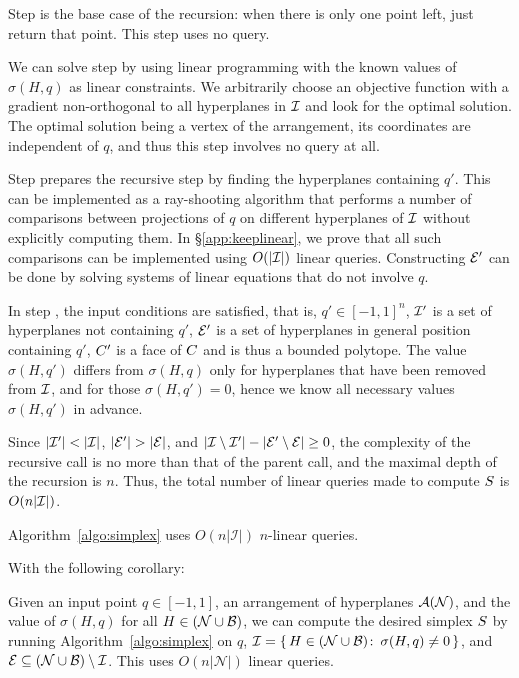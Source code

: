 Step  is the base case of the recursion: when there is only one point left,
just return that point. This step uses no query.

We can solve step  by using linear programming with the known values
of \(\sigma(H,q)\) as linear constraints. We arbitrarily choose an
objective function with a gradient non-orthogonal to all hyperplanes in
\(\mathcal{I}\) and look for the optimal solution. The optimal solution being a vertex of the arrangement,
its coordinates are independent of \(q\), and thus this step involves no query at all.

Step  prepares the recursive step by finding the hyperplanes containing
\(q'\). This can be implemented as a ray-shooting algorithm that performs
a number of comparisons between projections of $q$ on different hyperplanes of $\mathcal{I}$ without
explicitly computing them. In \S\ref{app:keeplinear}, we prove that all such comparisons
can be implemented using \(O(|{\mathcal{I}}|)\) linear queries.
Constructing \(\mathcal{E}'\) can be done by solving systems of linear
equations that do not involve \(q\).

In step , the input conditions are satisfied, that is, $q' \in
{[-1,1]}^n$, \(\mathcal{I}'\) is a set of hyperplanes not containing \(q'\), \(\mathcal{E}'\) is
a set of hyperplanes in general position containing \(q'\), \(C'\) is a
face of \(C\) and is thus a bounded polytope. The value \(\sigma(H,q')\)
differs from \(\sigma(H,q)\) only for hyperplanes that have been removed from
\(\mathcal{I}\), and for those \(\sigma(H,q') = 0\), hence we know all necessary values
\(\sigma(H,q')\) in advance.

Since \(|{\mathcal{I}'}| < |{\mathcal{I}}|\), \(|{\mathcal{E}'}| > |{\mathcal{E}}|\), and
\(|{\mathcal{I}\setminus\mathcal{I}'}| - |{\mathcal{E}'\setminus\mathcal{E}}| \ge 0\), the complexity of the
recursive call is no more than that of the parent call, and the maximal depth
of the recursion is \(n\). Thus, the total number of
linear queries made to compute \(S\) is \(O(n|{\mathcal{I}}|)\).
%
\begin{lemma}[%
	label={lem:simplex}%
]
	Algorithm~\ref{algo:simplex} uses \(O(n | \mathcal{I} |)\) \(n\)-linear
	queries.
\end{lemma}

With the following corollary:
%
\begin{corollary}[%
	label={cor:simplex}%
]
Given an input point \(q \in [-1,1]\), an arrangement of hyperplanes
\(\mathcal{A}(\mathcal{N})\), and the value of \(\sigma(H,q)\) for all
\(H \in (\mathcal{N}\cup\mathcal{B})\), we can compute the desired simplex \(S\)
by running Algorithm~\ref{algo:simplex} on \(q\),
\(\mathcal{I}=\{\,H \in (\mathcal{N}\cup\mathcal{B}) \colon\, \sigma(H,q) \neq 0\,\}\), and
\(\mathcal{E} \subseteq (\mathcal{N}\cup\mathcal{B}) \setminus\mathcal{I}\).
This uses $O( n | \mathcal{N} | )$ linear queries.
\end{corollary}

